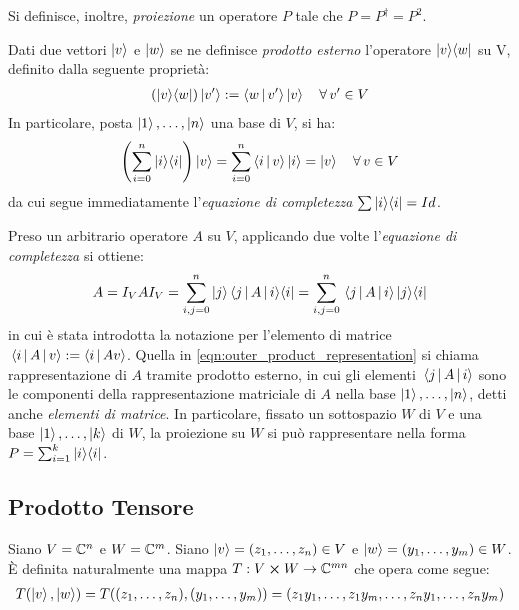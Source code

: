 Si definisce, inoltre, \textit{proiezione} un operatore $P$ tale che $P = P^\dagger = P^2$.

Dati due vettori $\ket{v}$ e $\ket{w}$ se ne definisce \textit{prodotto esterno} l'operatore $\ket{v}\! \bra{w}$ su V, definito dalla seguente proprietà:
\begin{align*}
 \left(\ket{v}\! \bra{w}\right) \ket{v'} := \braket{w\,}{\, v'} \ket{v} \quad \forall\, v' \in V
\end{align*}
In particolare, posta $\ket{1}, \dots, \ket{n}$ una base di $V$, si ha:
\begin{align*}
 \left(\sum_{i=0}^n\ket{i}\! \bra{i}\right) \ket{v} = \sum_{i=0}^n \braket{i\,}{\, v} \ket{i} = \ket{v} \quad \forall\, v \in V
\end{align*}
da cui segue immediatamente l'\textit{equazione di completezza} $\sum \ket{i}\! \bra{i} = Id$.

Preso un arbitrario operatore $A$ su $V$, applicando due volte l'\textit{equazione di completezza} si ottiene: 
\begin{align}\label{eqn:outer_product_representation}
 A = I_V A I_V = \sum_{i,j=0}^n \ket{j}\! \mel{j\,}{\, A \,}{\, i}\! \bra{i} = \sum_{i,j=0}^n \mel{j\,}{\, A \,}{\, i} \ket{j}\! \bra{i}
\end{align}
in cui è stata introdotta la notazione per l'elemento di matrice $\mel{i\,}{\, A \,}{\, v} := \braket{i\,}{\, Av}$. Quella in \eqref{eqn:outer_product_representation} si chiama rappresentazione di $A$ tramite prodotto esterno, in cui gli elementi $\mel{j\,}{\, A \,}{\, i}$ sono le componenti della rappresentazione matriciale di $A$ nella base $\ket{1}, \dots, \ket{n}$, detti anche \textit{elementi di matrice}.
In particolare, fissato un sottospazio $W$ di $V$ e una base $\ket{1}, \dots, \ket{k}$ di $W$, la proiezione su $W$ si può rappresentare nella forma $P = \sum_{i=1}^k \ket{i}\! \bra{i}$.

\subsection{Prodotto Tensore}
Siano $V = \mathbb{C}^{n}$ e $W = \mathbb{C}^{m}$. Siano ${\ket{v} = (z_1, \dots, z_n) \in V}$ e ${\ket{w} = (y_1, \dots, y_m) \in W}$. È definita naturalmente una mappa $T: V \cross W \to \mathbb{C}^{mn}$ che opera come segue:
\begin{align*}
 T(\ket{v},\ket{w}) = T((z_1,\dots,z_n), (y_1, \dots, y_m)) = (z_1y_1, \dots, z_1y_m, \dots, z_ny_1, \dots, z_ny_m)
\end{align*}

